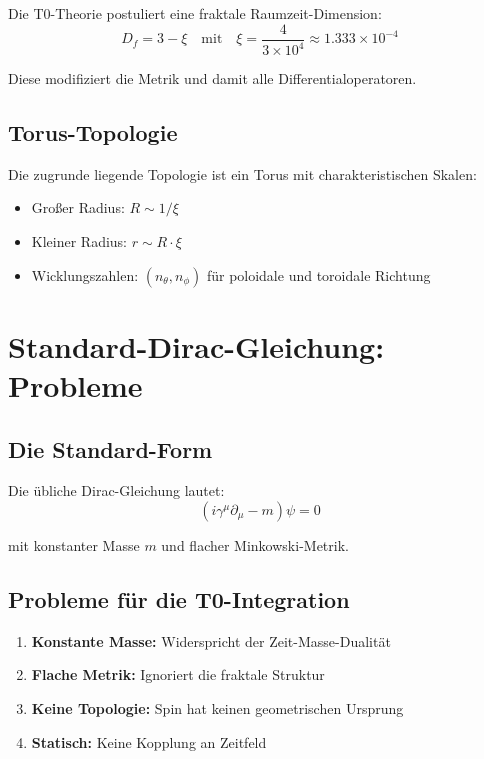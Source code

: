 	Die T0-Theorie postuliert eine fraktale Raumzeit-Dimension:
	\begin{equation}
		D_f = 3 - \xi \quad \text{mit} \quad \xi = \frac{4}{3 \times 10^4} \approx 1.333 \times 10^{-4}
		\label{eq:fractal_dim}
	\end{equation}
	
	Diese modifiziert die Metrik und damit alle Differentialoperatoren.
	
	\subsection{Torus-Topologie}
	
	Die zugrunde liegende Topologie ist ein Torus mit charakteristischen Skalen:
	\begin{itemize}
		\item Großer Radius: $R \sim 1/\xi$
		\item Kleiner Radius: $r \sim R \cdot \xi$
		\item Wicklungszahlen: $(n_\theta, n_\phi)$ für poloidale und toroidale Richtung
	\end{itemize}
	
	\section{Standard-Dirac-Gleichung: Probleme}
	
	\subsection{Die Standard-Form}
	
	Die übliche Dirac-Gleichung lautet:
	\begin{equation}
		(i\gamma^\mu \partial_\mu - m)\psi = 0
		\label{eq:standard_dirac}
	\end{equation}
	
	mit konstanter Masse $m$ und flacher Minkowski-Metrik.
	
	\subsection{Probleme für die T0-Integration}
	
	\begin{enumerate}
		\item \textbf{Konstante Masse:} Widerspricht der Zeit-Masse-Dualität
		\item \textbf{Flache Metrik:} Ignoriert die fraktale Struktur
		\item \textbf{Keine Topologie:} Spin hat keinen geometrischen Ursprung
		\item \textbf{Statisch:} Keine Kopplung an Zeitfeld
	\end{enumerate}

